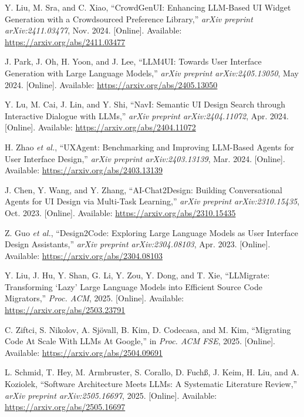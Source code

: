 \documentclass[12pt]{article}
\begin{document}
\begin{thebibliography}{99}
Y. Liu, M. Sra, and C. Xiao, “CrowdGenUI: Enhancing LLM-Based UI Widget Generation with a Crowdsourced Preference Library,” \textit{arXiv preprint arXiv:2411.03477}, Nov. 2024. [Online]. Available: \url{https://arxiv.org/abs/2411.03477}

J. Park, J. Oh, H. Yoon, and J. Lee, “LLM4UI: Towards User Interface Generation with Large Language Models,” \textit{arXiv preprint arXiv:2405.13050}, May 2024. [Online]. Available: \url{https://arxiv.org/abs/2405.13050}

Y. Lu, M. Cai, J. Lin, and Y. Shi, “NavI: Semantic UI Design Search through Interactive Dialogue with LLMs,” \textit{arXiv preprint arXiv:2404.11072}, Apr. 2024. [Online]. Available: \url{https://arxiv.org/abs/2404.11072}

H. Zhao \textit{et al.}, “UXAgent: Benchmarking and Improving LLM-Based Agents for User Interface Design,” \textit{arXiv preprint arXiv:2403.13139}, Mar. 2024. [Online]. Available: \url{https://arxiv.org/abs/2403.13139}

J. Chen, Y. Wang, and Y. Zhang, “AI-Chat2Design: Building Conversational Agents for UI Design via Multi-Task Learning,” \textit{arXiv preprint arXiv:2310.15435}, Oct. 2023. [Online]. Available: \url{https://arxiv.org/abs/2310.15435}

Z. Guo \textit{et al.}, “Design2Code: Exploring Large Language Models as User Interface Design Assistants,” \textit{arXiv preprint arXiv:2304.08103}, Apr. 2023. [Online]. Available: \url{https://arxiv.org/abs/2304.08103}

Y. Liu, J. Hu, Y. Shan, G. Li, Y. Zou, Y. Dong, and T. Xie, “LLMigrate: Transforming ‘Lazy’ Large Language Models into Efficient Source Code Migrators,” \textit{Proc. ACM}, 2025. [Online]. Available: \url{https://arxiv.org/abs/2503.23791}

C. Ziftci, S. Nikolov, A. Sjövall, B. Kim, D. Codecasa, and M. Kim, “Migrating Code At Scale With LLMs At Google,” in \textit{Proc. ACM FSE}, 2025. [Online]. Available: \url{https://arxiv.org/abs/2504.09691}

L. Schmid, T. Hey, M. Armbruster, S. Corallo, D. Fuchß, J. Keim, H. Liu, and A. Koziolek, “Software Architecture Meets LLMs: A Systematic Literature Review,” \textit{arXiv preprint arXiv:2505.16697}, 2025. [Online]. Available: \url{https://arxiv.org/abs/2505.16697}

\end{thebibliography}
\end{document}
